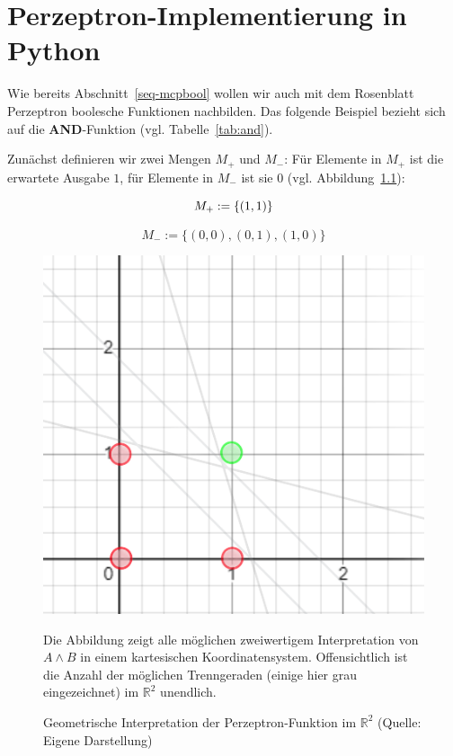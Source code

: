 \chapter{Perzeptron-Implementierung in Python}\label{appendix:pythonperzeptron}

Wie bereits Abschnitt~\ref{seq-mcpbool} wollen wir auch mit dem Rosenblatt Perzeptron boolesche Funktionen nachbilden.
Das folgende Beispiel bezieht sich auf die \textbf{AND}-Funktion (vgl. Tabelle~\ref{tab:and}).

Zunächst definieren wir zwei Mengen $M_+$ und $M_-$: Für Elemente in $M_+$ ist die erwartete Ausgabe $1$, für Elemente in $M_-$ ist sie $0$ (vgl. Abbildung~\ref{fig-rpand}):

\begin{equation}
    M_+ := \{(1, 1)\}\\
\end{equation}

\begin{equation}
    M_- := \{(0, 0), (0,1), (1,0)\}
\end{equation}

\begin{figure}[h]
    \begin{center}
    \includegraphics{chapters/Anhang/perceptron-and}
    \caption{Geometrische Interpretation der Perzeptron-Funktion im $\mathbb{R}^2$ (Quelle: Eigene Darstellung)}
    \end{center}
    \label{fig-rpand}
    \small {
    Die Abbildung zeigt alle möglichen zweiwertigem Interpretation von $A \land B$ in einem kartesischen Koordinatensystem.
    Offensichtlich ist die Anzahl der möglichen Trenngeraden (einige hier grau eingezeichnet) im $\mathbb{R}^2$ unendlich.
    }
\end{figure}

